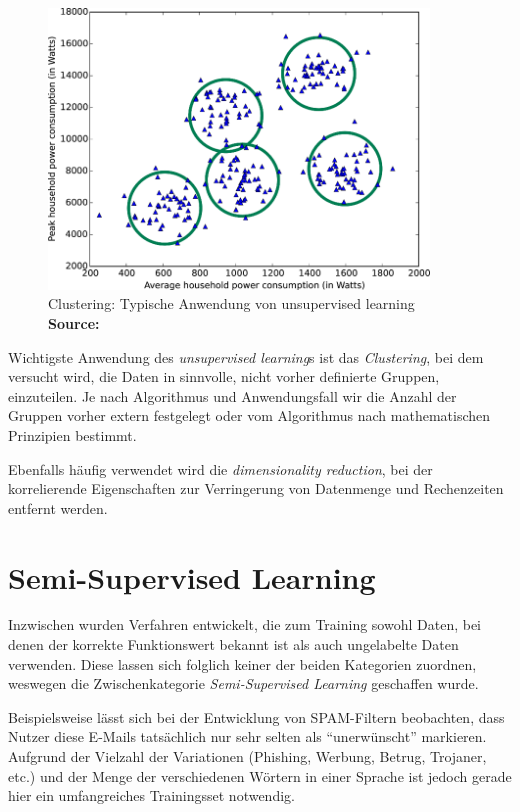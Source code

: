 \documentclass[runningheads,a4paper]{llncs}
\newcommand*{\captionsource}[2]{%
  \caption[{#1}]{%
    #1%
    \\\hspace{\linewidth}%
    \textbf{Source:} #2%
  }%
}
\begin{document}
\begin{figure} [ht]
  \centering
  \includegraphics[width=0.9\textwidth]{res/classification.png}
      \captionsource{Clustering: Typische Anwendung von unsupervised learning}{\cite{Howto22:online}}
  \label{fig:cluserting}
\end{figure}


Wichtigste Anwendung des \emph{unsupervised learning}s ist das \emph{Clustering}, bei dem versucht wird, die Daten in sinnvolle, nicht vorher definierte Gruppen, einzuteilen. Je nach Algorithmus und Anwendungsfall wir die Anzahl der Gruppen vorher extern festgelegt oder vom Algorithmus nach mathematischen Prinzipien bestimmt. 

Ebenfalls häufig verwendet wird die \emph{dimensionality reduction}, bei der korrelierende Eigenschaften zur Verringerung von Datenmenge und Rechenzeiten entfernt werden.

\section{Semi-Supervised Learning}

Inzwischen wurden Verfahren entwickelt, die zum Training sowohl Daten, bei denen der korrekte Funktionswert bekannt ist als auch ungelabelte Daten verwenden. Diese lassen sich folglich keiner der beiden Kategorien zuordnen, weswegen die Zwischenkategorie \emph{Semi-Supervised Learning} geschaffen wurde. 

Beispielsweise lässt sich bei der Entwicklung von SPAM-Filtern beobachten, dass Nutzer diese E-Mails tatsächlich nur sehr selten als \enquote{unerwünscht} markieren. Aufgrund der Vielzahl der Variationen (Phishing, Werbung, Betrug, Trojaner, etc.) und der Menge der verschiedenen Wörtern in einer Sprache ist jedoch gerade hier ein umfangreiches Trainingsset notwendig.
\end{document}
